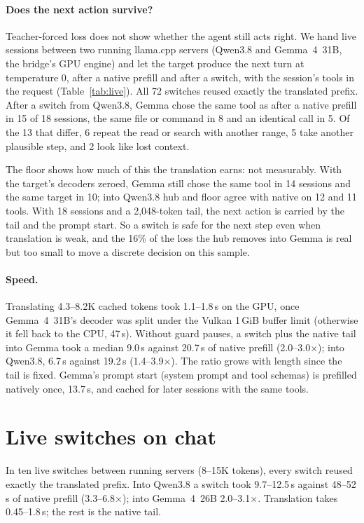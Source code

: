\documentclass[11pt]{article}
\begin{document}
\paragraph{Does the next action survive?} Teacher-forced loss does not show whether the agent still acts
right. We hand live sessions between two running llama.cpp servers (Qwen3.8 and Gemma~4~31B, the bridge's GPU
engine) and let the target produce the next turn at temperature 0, after a native prefill and after a switch, with
the session's tools in the request (Table~\ref{tab:live}). All 72 switches reused exactly the translated prefix.
After a switch from Qwen3.8, Gemma chose the same tool as after a native prefill in 15 of 18 sessions, the same file
or command in 8 and an identical call in 5. Of the 13 that differ, 6 repeat the read or search with another
range, 5 take another plausible step, and 2 look like lost context.

The floor shows how much of this the translation earns: not measurably. With the target's decoders zeroed, Gemma
still chose the same tool in 14 sessions and the same target in 10; into Qwen3.8 hub and floor agree with native on
12 and 11 tools. With 18 sessions and a 2,048-token tail, the next action is carried by the tail and the prompt start.
So a switch is safe for the next step even when translation is weak, and the 16\% of the loss the hub removes into
Gemma is real but too small to move a discrete decision on this sample.

\paragraph{Speed.} Translating 4.3--8.2K cached tokens took 1.1--1.8\,s on the GPU, once Gemma~4~31B's decoder was
split under the Vulkan 1\,GiB buffer limit (otherwise it fell back to the CPU, 47\,s). Without guard
pauses, a switch plus the native tail into Gemma took a median 9.0\,s against 20.7\,s of native prefill
(2.0--3.0$\times$); into Qwen3.8, 6.7\,s against 19.2\,s (1.4--3.9$\times$). The ratio grows with length since the tail is fixed. Gemma's prompt start (system prompt and tool schemas) is prefilled natively once, 13.7\,s,
and cached for later sessions with the same tools.

\section{Live switches on chat}\label{sec:live}
In ten live switches between running servers (8--15K tokens), every switch reused exactly the translated prefix.
Into Qwen3.8 a switch took 9.7--12.5\,s against 48--52\,s of native prefill (3.3--6.8$\times$); into Gemma~4~26B
2.0--3.1$\times$. Translation takes 0.45--1.8\,s; the rest is the native tail.
\end{document}
